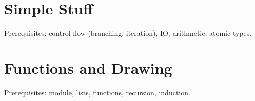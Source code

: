 \tableofcontents

\section{Simple Stuff}
Prerequisites: control flow (branching, iteration), IO, arithmetic, atomic types.


\section{Functions and Drawing}
Prerequisites:  module, lists, functions, recursion, induction.


\clearpage
\doclicenseThis


